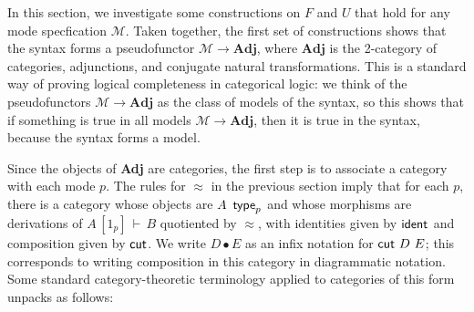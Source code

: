 \documentclass{drl-common/llncs}
\newcommand{\M}{\ensuremath{\mathcal{M}}}
\newcommand{\Adj}{\textbf{Adj}}
\renewcommand\wftp[2]{\ensuremath{#1 \,\,\, \dsd{type}_{#2}}}
\newcommand\seq[3]{\ensuremath{#1 \, [ #2 ] \, \vdash \, #3}}
\newcommand\ident[1]{\ensuremath{\dsd{ident}_{#1}}}
\newcommand\cutsym{\ensuremath{\dsd{cut}}}
\newcommand\cut[2]{\ensuremath{{\cutsym \,\, #1 \,\, #2}}}
\newcommand\cuti{\ensuremath{\bullet}}
\newcommand\ap[2]{\ensuremath{#1 \approx #2}}
\begin{document}
In this section, we investigate some constructions on $F$ and $U$ that
hold for any mode specfication $\M$.  Taken together, the first set of
constructions shows that the syntax forms a pseudofunctor $\M \to \Adj$,
where $\Adj$ is the 2-category of categories, adjunctions, and conjugate
natural transformations.  This is a standard way of proving logical
completeness in categorical logic: we think of the pseudofunctors $\M
\to \Adj$ as the class of models of the syntax, so this shows that if
something is true in all models $\M \to \Adj$, then it is true in the
syntax, because the syntax forms a model.  

Since the objects of \Adj\/ are categories,
the first step is to associate a category with each mode $p$.  The rules
for $\ap{}{}$ in the previous section imply that for each $p$, there is
a category whose objects are \wftp{A}{p} and whose morphisms are
derivations of \seq{A}{1_p}{B} quotiented by $\ap{}{}$, with identities
given by \ident{} and composition given by \cutsym.  We write $D \cuti
E$ as an infix notation for \cut{D}{E}; this corresponds to writing
composition in this category in diagrammatic notation. Some standard
category-theoretic terminology applied to categories of this form
unpacks as follows:
\end{document}
